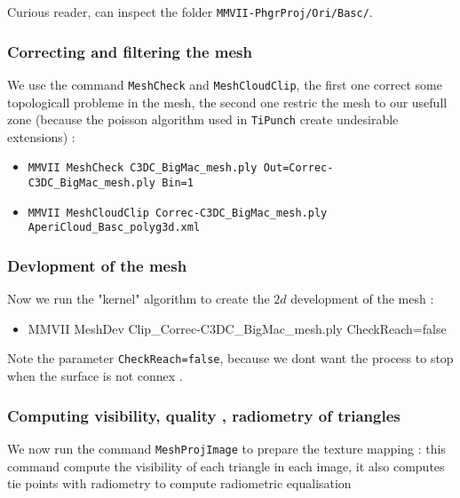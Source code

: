 Curious reader, can inspect the folder {\tt MMVII-PhgrProj/Ori/Basc/}.


\subsubsection{Correcting and filtering the mesh}

We use the command {\tt MeshCheck} and {\tt MeshCloudClip}, the first one
correct some topologicall probleme in the mesh, the second one restric
the mesh to our usefull zone  (because the poisson algorithm used in {\tt TiPunch}
create undesirable extensions) :

\begin{itemize}
	\item {\tt MMVII  MeshCheck C3DC\_BigMac\_mesh.ply Out=Correc-C3DC\_BigMac\_mesh.ply Bin=1}

	\item {\tt MMVII  MeshCloudClip Correc-C3DC\_BigMac\_mesh.ply  AperiCloud\_Basc\_polyg3d.xml}
\end{itemize}


\subsubsection{Devlopment of the mesh}

Now we run the "kernel" algorithm to create the $2d$ development of the mesh :

\begin{itemize}
    \item {MMVII MeshDev Clip\_Correc-C3DC\_BigMac\_mesh.ply CheckReach=false}
\end{itemize}

Note the parameter {\tt CheckReach=false}, because we dont want the process to stop when 
the surface is not connex .


\subsubsection{Computing visibility, quality , radiometry of triangles}

We now run the command  {\tt MeshProjImage} to prepare the texture mapping : this command
compute the visibility of each triangle in each image, it also computes tie points with 
radiometry to compute radiometric equalisation 

